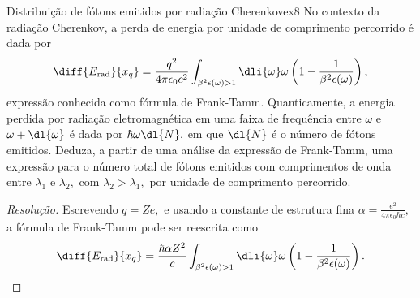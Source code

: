 \begin{exercício}{Distribuição de fótons emitidos por radiação Cherenkov}{ex8}
    No contexto da radiação Cherenkov, a perda de energia por unidade de comprimento percorrido é dada por
    \begin{equation*}
        \diff{E_\mathrm{rad}}{x_q} = \frac{q^2}{4\pi \epsilon_0 c^2} \int_{\beta^2 \epsilon(\omega) > 1} \dli{\omega}\omega\left(1 - \frac{1}{\beta^2 \epsilon(\omega)}\right),
    \end{equation*}
    expressão conhecida como fórmula de Frank-Tamm. Quanticamente, a energia perdida por radiação eletromagnética em uma faixa de frequência entre \(\omega\) e \(\omega + \dl{\omega}\) é dada por \(\hbar \omega \dl{N},\) em que \(\dl{N}\) é o número de fótons emitidos. Deduza, a partir de uma análise da expressão de Frank-Tamm, uma expressão para o número total de fótons emitidos com comprimentos de onda entre \(\lambda_1\) e \(\lambda_2,\) com \(\lambda_2 > \lambda_1,\) por unidade de comprimento percorrido.
\end{exercício}
\begin{proof}[Resolução]
    Escrevendo \(q = Ze,\) e usando a constante de estrutura fina \(\alpha = \frac{e^2}{4\pi \epsilon_0 \hbar c},\) a fórmula de Frank-Tamm pode ser reescrita como
    \begin{equation*}
        \diff{E_\mathrm{rad}}{x_q} = \frac{\hbar \alpha Z^2}{c} \int_{\beta^2 \epsilon(\omega) > 1} \dli{\omega}\omega\left(1 - \frac{1}{\beta^2 \epsilon(\omega)}\right).
    \end{equation*}
\end{proof}

